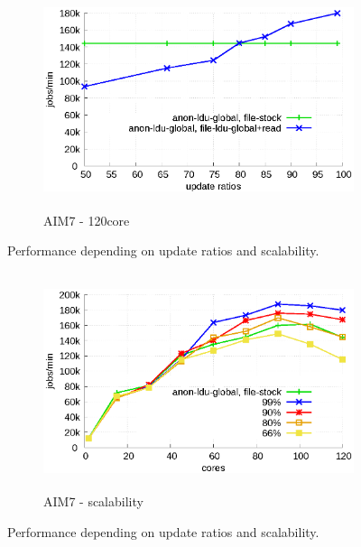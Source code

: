\begin{figure}[t!]
    \centering
    \begin{subfigure}[b]{1\textwidth}
  \begin{center}
        \includegraphics[height=2.5in]{graph/ratio_exim.eps}
        \caption{AIM7 - 120core}
  \end{center}
    \end{subfigure}%
    \caption{Performance depending on update ratios and scalability.}
    \label{fig:UpdateRate_exim}
\end{figure}

\begin{figure}[t!]
    \centering
    \begin{subfigure}[b]{1\textwidth}
        \includegraphics[height=2.5in]{graph/ratio_exim_core.eps}
        \caption{AIM7 - scalability}
    \end{subfigure}%
    \caption{Performance depending on update ratios and scalability.}
    \label{fig:UpdateRate_exim_2}
\end{figure}

